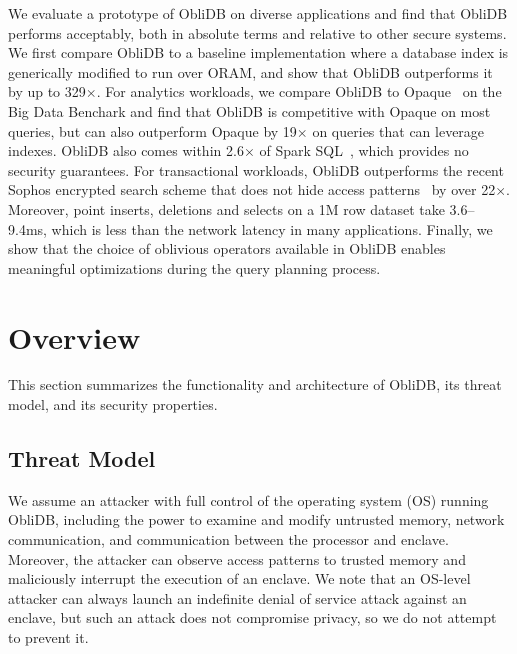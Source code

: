 \documentclass[letterpaper,twocolumn,10pt]{article}
\def\name/{ObliDB}
\begin{document}
We evaluate a prototype of \name/ on diverse applications and find that \name/ performs acceptably, both in absolute terms and relative to other secure systems.
We first compare \name/ to a baseline implementation where a database index is generically modified to run over ORAM, and show that \name/ outperforms it by up to 329$\times$.
For analytics workloads, we compare \name/ to Opaque~\cite{ZDB+17} on the Big Data Benchark\cite{BDB} and find that \name/ is competitive with Opaque on most queries, but can also outperform Opaque by 19$\times$ on queries that can leverage indexes.
\name/ also comes within 2.6$\times$ of Spark SQL~\cite{SparkSQL}, which provides no security guarantees.
For transactional workloads, \name/ outperforms the recent Sophos encrypted search scheme that does not hide access patterns~\cite{Bost16} by over 22$\times$.
Moreover, point inserts, deletions and selects on a 1M row dataset take 3.6--9.4ms,
which is less than the network latency in many applications.
Finally, we show that the choice of oblivious operators available in \name/ enables meaningful optimizations during the query planning process.


\section{Overview}\label{model}
This section summarizes the functionality and architecture of \name/, its threat model, and its security properties.

\subsection{Threat Model}
We assume an attacker with full control of the operating system (OS) running \name/, including the power to examine and modify untrusted memory, network communication, and communication between the processor and enclave. Moreover, the attacker can observe access patterns to trusted memory and maliciously  interrupt the execution of an enclave. We note that an OS-level attacker can always launch an indefinite denial of service attack against an enclave, but such an attack does not compromise privacy, so we do not attempt to prevent it.
\end{document}
